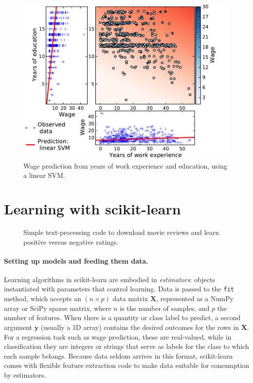 \documentclass[a4paper]{article}
\begin{document}
\begin{figure}[b]
    \hspace*{-.015\linewidth}%
    \includegraphics[width=1.05\linewidth]{wage_data_linear_svm}%

    \caption{Wage prediction from years of work experience and education,
    using a linear SVM.\label{fig:linear_svm}}
\end{figure}

\section{Learning with scikit-learn}

\begin{figure}[b]

\caption{Simple text-processing code to download movie reviews
and learn positive versus negative ratings.\label{fig:code}}
\end{figure}


\paragraph{Setting up models and feeding them data.}
%
Learning algorithms in scikit-learn are embodied in \emph{estimators}:
objects instantiated with parameters that control learning.
Data is passed to the {\tt fit} method,
which accepts an $(n \times p)$ data matrix $\mathbf{X}$,
represented as a NumPy array or SciPy sparse matrix, where $n$ is the
number of samples, and $p$ the number of features.
When there is a quantity or class label to predict,
a second argument $\mathbf{y}$ (usually a 1D array)
contains the desired outcomes for the rows in $\mathbf{X}$.
For a regression task such as wage prediction, these are real-valued,
while in classification they are integers or strings that serve as labels
for the class to which each sample belongs.
Because data seldom arrives in this format,
scikit-learn comes with flexible feature extraction code
to make data suitable for consumption by estimators.
\end{document}

